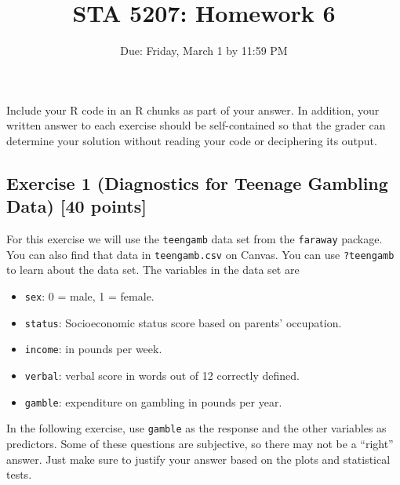 \documentclass[
]{article}
\title{STA 5207: Homework 6}
\author{}
\date{\vspace{-2.5em}Due: Friday, March 1 by 11:59 PM}
\providecommand{\tightlist}{%
  \setlength{\itemsep}{0pt}\setlength{\parskip}{0pt}}
\begin{document}
\maketitle

Include your R code in an R chunks as part of your answer. In addition,
your written answer to each exercise should be self-contained so that
the grader can determine your solution without reading your code or
deciphering its output.

\hypertarget{exercise-1-diagnostics-for-teenage-gambling-data-40-points}{%
\subsection{Exercise 1 (Diagnostics for Teenage Gambling Data) {[}40
points{]}}\label{exercise-1-diagnostics-for-teenage-gambling-data-40-points}}

For this exercise we will use the \texttt{teengamb} data set from the
\texttt{faraway} package. You can also find that data in
\texttt{teengamb.csv} on Canvas. You can use \texttt{?teengamb} to learn
about the data set. The variables in the data set are

\begin{itemize}
\tightlist
\item
  \texttt{sex}: 0 = male, 1 = female.
\item
  \texttt{status}: Socioeconomic status score based on parents'
  occupation.
\item
  \texttt{income}: in pounds per week.
\item
  \texttt{verbal}: verbal score in words out of 12 correctly defined.
\item
  \texttt{gamble}: expenditure on gambling in pounds per year.
\end{itemize}

In the following exercise, use \texttt{gamble} as the response and the
other variables as predictors. Some of these questions are subjective,
so there may not be a ``right'' answer. Just make sure to justify your
answer based on the plots and statistical tests.
\end{document}
